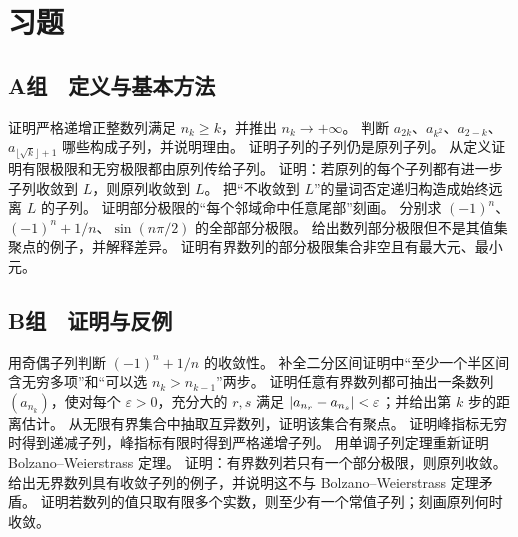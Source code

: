 \section*{习题}

\subsection*{A组　定义与基本方法}
\begin{enumerate}[label=\textbf{\thechapter.\arabic*.}]
  证明严格递增正整数列满足 \(n_k\ge k\)，并推出 \(n_k\to+\infty\)。
  判断 \(a_{2k}\)、\(a_{k^2}\)、\(a_{2-k}\)、\(a_{\lfloor\sqrt k\rfloor+1}\) 哪些构成子列，并说明理由。
  证明子列的子列仍是原列子列。
  从定义证明有限极限和无穷极限都由原列传给子列。
  证明：若原列的每个子列都有进一步子列收敛到 \(L\)，则原列收敛到 \(L\)。
  把“不收敛到 \(L\)”的量词否定递归构造成始终远离 \(L\) 的子列。
  证明部分极限的“每个邻域命中任意尾部”刻画。
  分别求 \((-1)^n\)、\((-1)^n+1/n\)、\(\sin(n\pi/2)\) 的全部部分极限。
  给出数列部分极限但不是其值集聚点的例子，并解释差异。
  证明有界数列的部分极限集合非空且有最大元、最小元。
\end{enumerate}

\subsection*{B组　证明与反例}
\begin{enumerate}[label=\textbf{\thechapter.\arabic*.},resume]
  用奇偶子列判断 \((-1)^n+1/n\) 的收敛性。
  补全二分区间证明中“至少一个半区间含无穷多项”和“可以选 \(n_k>n_{k-1}\)”两步。
  证明任意有界数列都可抽出一条数列
 \((a_{n_k})\)，使对每个 \(\varepsilon>0\)，充分大的 \(r,s\) 满足
 \(\left|a_{n_r}-a_{n_s}\right|<\varepsilon\)；并给出第 \(k\) 步的距离估计。
  从无限有界集合中抽取互异数列，证明该集合有聚点。
  证明峰指标无穷时得到递减子列，峰指标有限时得到严格递增子列。
  用单调子列定理重新证明 Bolzano--Weierstrass 定理。
  证明：有界数列若只有一个部分极限，则原列收敛。
  给出无界数列具有收敛子列的例子，并说明这不与 Bolzano--Weierstrass 定理矛盾。
  证明若数列的值只取有限多个实数，则至少有一个常值子列；刻画原列何时收敛。
\end{enumerate}

